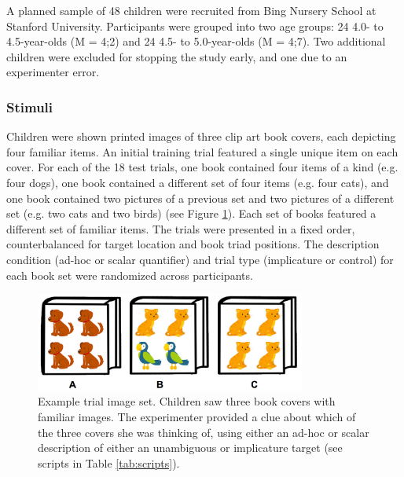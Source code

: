 \documentclass[10pt,letterpaper]{article}
\begin{document}
A planned sample of 48 children were recruited from Bing Nursery School at Stanford University.  Participants were grouped into two age groups: 24 4.0- to 4.5-year-olds (M = 4;2) and 24 4.5- to 5.0-year-olds (M = 4;7). Two additional children were excluded for stopping the study early, and one due to an experimenter error. 
\subsubsection{Stimuli}

Children were shown printed images of three clip art book covers, each depicting four familiar items. An initial training trial featured a single unique item on each cover. For each of the 18 test trials, one book contained four items of a kind (e.g. four dogs), one book contained a different set of four items (e.g. four cats), and one book contained two pictures of a previous set and two pictures of a different set (e.g. two cats and two birds) (see Figure \ref{fig:demo}). Each set of books featured a different set of familiar items. The trials were presented in a fixed order, counterbalanced for target location and book triad positions.  The description condition (ad-hoc or scalar quantifier) and trial type (implicature or control) for each book set were randomized across participants. 

\begin{figure}[t] 
  \begin{center} 
    \includegraphics[width=3.5in]{figures/implicatures_demo_letters.png} 
    \caption{\label{fig:demo} Example trial image set. Children saw three book covers with familiar images. The experimenter provided a clue about which of the three covers she was thinking of, using either an ad-hoc or scalar description of either an unambiguous or implicature target (see scripts in Table \ref{tab:scripts}).  
    }
    \end{center} 
\vspace{-1ex} 
\end{figure}
\end{document}
